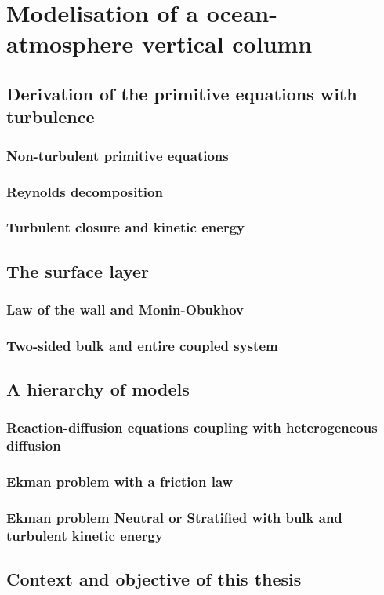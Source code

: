 \chapter{Modelisation of a ocean-atmosphere vertical column}
\label{ch:airseaSCM}
\minitoc
\section{Derivation of the primitive equations with turbulence}
\subsection{Non-turbulent primitive equations}
\subsection{Reynolds decomposition}
\subsection{Turbulent closure and kinetic energy}
\section{The surface layer}
\subsection{Law of the wall and Monin-Obukhov}
\subsection{Two-sided bulk and entire coupled system}
\section{A hierarchy of models}
\subsection{Reaction-diffusion equations coupling with heterogeneous diffusion}
\subsection{Ekman problem with a friction law}
\subsection{Ekman problem Neutral or Stratified with bulk and turbulent kinetic energy}
\section{Context and objective of this thesis}
